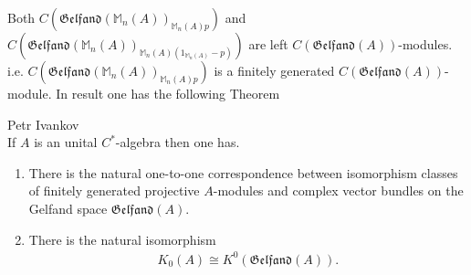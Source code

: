\documentclass{beamer}
\theoremstyle{plain}
\newcommand{\bean}{\begin{eqnarray*}}
\newcommand{\eean}{\end{eqnarray*}}
\begin{document}
\begin{frame}

Both $C\left( \mathfrak{Gelfand}\left(\mathbb{M}_n\left(A \right)\right)_{\mathbb{M}_n\left(A \right)p} \right)$ and $C\left(  \mathfrak{Gelfand}\left(\mathbb{M}_n\left(A \right)\right)_{\mathbb{M}_n\left(A \right)\left(1_{\mathbb{M}_n\left(A \right)} -p\right) }\right)$ are left $C\left(\mathfrak{Gelfand}\left(A \right) \right)$-modules.
i.e. 	$C\left( \mathfrak{Gelfand}\left(\mathbb{M}_n\left(A \right)\right)_{\mathbb{M}_n\left(A \right)p}\right) $ is a finitely generated $C\left(\mathfrak{Gelfand}\left(A \right) \right)$-module. In result one has the following Theorem 
\begin{theorem}\alert{Petr Ivankov}\\
	If $A$ is an unital $C^*$-algebra then one has.
	\begin{enumerate}
		\item [(i)] There is the natural one-to-one correspondence between isomorphism classes of  finitely generated projective $A$-modules and complex vector bundles on the Gelfand space  $\mathfrak{Gelfand}\left(A \right)$.
		\item[(ii)] There is the natural isomorphism
		\bean
		K_0\left( A\right) \cong K^0\left( \mathfrak{Gelfand}\left(A \right)\right). 
		\eean
	\end{enumerate}
	\end{theorem}\end{frame}
\end{document}

